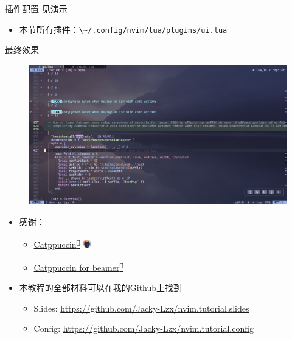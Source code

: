 \documentclass[aspectratio=169]{ctexbeamer}
\newcommand{\nerd}[1]{\texttt{#1}}
\newcommand{\link}[3][]{\href{#3}{#2\textsuperscript{\nerd{}}}}
\begin{document}
\begin{frame}{插件配置}
  见演示
  \begin{itemize}
    \item 本节所有插件：\lstinline[language={},style=path]{\~/.config/nvim/lua/plugins/ui.lua}
  \end{itemize}
\end{frame}

\begin{frame}{最终效果}
  \begin{figure}[H]
    \centering
    \includegraphics[width=0.75\linewidth]{./Figures/Final_Result.jpg}
  \end{figure}
\end{frame}

\begin{frame}
  \begin{itemize}
    \item 感谢：
      \begin{itemize}
        \item \link{Catppuccin}{https://catppuccin.com/} \includegraphics[height=10pt]{./Figures/Catppuccin_logo.png}
        \item \link{Catppuccin for beamer}{https://github.com/atticus-sullivan/beamercolortheme}
      \end{itemize}
      \vspace{0.5cm}
    \item 本教程的全部材料可以在我的Github上找到
      \begin{itemize}
        \item Slides: \url{https://github.com/Jacky-Lzx/nvim.tutorial.slides}
        \item Config: \url{https://github.com/Jacky-Lzx/nvim.tutorial.config}
      \end{itemize}
  \end{itemize}
\end{frame}
\end{document}
